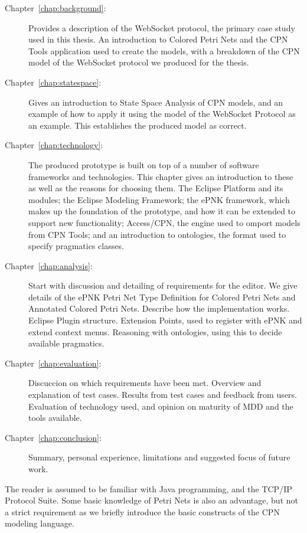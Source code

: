 \begin{description}
\item[Chapter~\ref{chap:background}:~] Provides a
description of the WebSocket protocol, the primary case study used in this thesis. An
introduction to Colored Petri Nets and the CPN Tools application used to
create the models, with a breakdown of the CPN model of the WebSocket protocol
we produced for the thesis.
\item[Chapter~\ref{chap:statespace}:~] Gives an
introduction to State Space Analysis of CPN models, and an example of how to
apply it using the model of the WebSocket Protocol as an example. This
establishes the produced model as correct. 
\item [Chapter~\ref{chap:technology}:~] The produced
prototype is built on top of a number of software frameworks and technologies.
This chapter gives an introduction to these as well as the reasons for choosing them.
The Eclipse Platform and its modules; the Eclipse Modeling Framework; the ePNK
framework, which makes up the foundation of the prototype, and how it can be
extended to support new functionality; Access/CPN, the engine used
to omport models from CPN Tools; and an introduction to ontologies, the format
used to specify pragmatics classes.
\item [Chapter~\ref{chap:analysis}:~] Start with
discussion and detailing of requirements for the editor. 
We give details of the ePNK Petri Net Type Definition for Colored Petri Nets and
Annotated Colored Petri Nets. Describe how the implementation works.
Eclipse Plugin structure. Extension Points, used to register with ePNK
and extend context menus. Reasoning with ontologies, using this to decide
available pragmatics.
\item [Chapter~\ref{chap:evaluation}:~] Discuccion on
which requirements have been met. Overview and explanation of test cases.
Results from test cases and feedback from users. Evaluation of technology used,
and opinion on maturity of MDD and the tools available.
\item [Chapter~\ref{chap:conclusion}:~] Summary,
personal experience, limitations and suggested focus of future work.
\end{description} 


The reader is assumed to be familiar with Java programming, and the TCP/IP
Protocol Suite. Some basic knowledge of Petri Nets is also an advantage, but not
a strict requirement as we briefly introduce the basic constructs of the CPN
modeling language.
